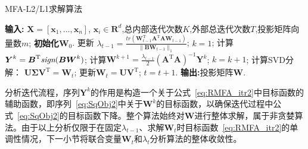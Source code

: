 \begin{algorithm}[!htbp]

\renewcommand\baselinestretch{1.2}\selectfont
\caption{MFA-L2/L1求解算法}\label{alg:MFA-L2/L1}
\begin{algorithmic}[1]
\State \textbf{输入:} {$\boldsymbol{X}=[\boldsymbol{x}_1,...,\boldsymbol{x}_n]$, $\boldsymbol{x}_i\in \mathbf{R}^d$,总内部迭代次数$K$,外部总迭代次数$T$,投影矩阵向量数$m$;}
\State \textbf{初始化$\boldsymbol{W}_0$}.
\State 更新 $\lambda_{t-1} = \frac{tr(\boldsymbol{W}_{t-1}^\mathrm{T}\boldsymbol{A}^\mathrm{T}\boldsymbol{A}\boldsymbol{W}_{t-1})}{\|\boldsymbol{B}\boldsymbol{W}_{t-1}\|_1}$;
\State $k=1$;
\State 计算$\boldsymbol{Y}^k = \boldsymbol{B}^\mathrm{T}\emph{sign}(\boldsymbol{B}\boldsymbol{W}^{k})$;
\State 计算$\boldsymbol{W}^{k+1}=\frac{\lambda_{t-1}}{2}(\boldsymbol{A}^\mathrm{T}\boldsymbol{A})^{-1}\boldsymbol{Y}^k$;
\State $k=k+1$;
\EndWhile %
\State 计算SVD分解： $\boldsymbol{U\Sigma }\boldsymbol{V}^\mathrm{T}=\boldsymbol{W}_t$;
\State 更新$\boldsymbol{W}_t=\boldsymbol{U}\boldsymbol{V}^\mathrm{T}$;
\State $t=t+1$.
\EndWhile  %
\State \textbf{输出:}投影矩阵$\boldsymbol{W}$.
\end{algorithmic}
\end{algorithm}

分析迭代流程，序列$\boldsymbol{Y}^k$的作用是构造一个关于公式~\eqref{eq:RMFA_itr2}中目标函数的辅助函数，即序列~\eqref{eq:SqObj2}中关于$\boldsymbol{W}^k$的目标函数，以确保迭代过程中公式~\eqref{eq:SqObj2}的目标函数下降。整个算法始终对$\boldsymbol{W}$进行整体求解，属于非贪婪算法。由于以上分析仅限于在固定$\lambda_{t-1}$、求解$\boldsymbol{W}_t$时目标函数~\eqref{eq:RMFA_itr2}的单调性情况，下一小节将联合变量$\boldsymbol{W}_t$和$\lambda_t$分析算法的整体收敛性。

